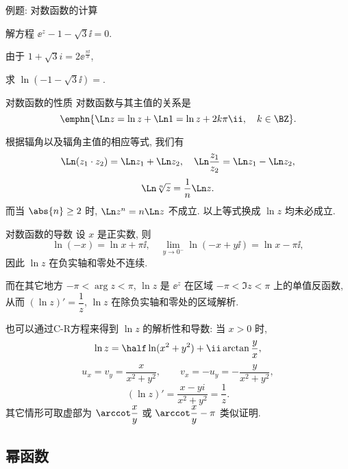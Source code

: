 \begin{frame}{例题: 对数函数的计算}
	\onslide<+->
	\begin{example}
		解方程 $\ee^z-1-\sqrt 3\ii=0$.
	\end{example}

	\onslide<+->
	\begin{solution}
		由于 $1+\sqrt 3 i=2\ee^{\frac{\pi\ii}3}$,
		\bigdel
	\end{solution}

	\onslide<+->
	\begin{exercise}
		求 $\ln(-1-\sqrt3\ii)=$.
	\end{exercise}
\end{frame}


\begin{frame}{对数函数的性质}
	\onslide<+->
	对数函数与其主值的关系是
	\[
		\emphn{\Ln z=\ln z+\Ln 1=\ln z+2k\pi\ii,\quad k\in\BZ}.
	\]

	\onslide<+->
	根据辐角以及辐角主值的相应等式, 我们有
	\[
		\Ln(z_1\cdot z_2)=\Ln z_1+\Ln z_2,\quad
		\Ln\frac{z_1}{z_2}=\Ln z_1-\Ln z_2,
	\]
	\[
		\Ln \sqrt[n]z=\dfrac1n\Ln z.
	\]
	\onslide<+->
	而当 $\abs{n}\ge 2$ 时, \alert{$\Ln z^n=n\Ln z$ 不成立}.
	\onslide<+->
	以上等式换成 $\ln z$ 均未必成立.
\end{frame}


\begin{frame}{对数函数的导数}
\beqskip{1pt}
	\onslide<+->
	设 $x$ 是正实数, 
	\onslide<+->
	则
	\[
		\ln (-x)=\ln x+\pi\ii,\quad
		\lim_{y\to0^-}\ln (-x+y\ii)=\ln x-\pi\ii,
	\]
	\onslide<+->
	因此 $\ln z$ 在负实轴和零处不连续.

	\onslide<+->
	而在其它地方 $-\pi<\arg z<\pi$, $\ln z$ 是 $\ee^z$ 在区域 $-\pi<\Im z<\pi$ 上的单值反函数, 
	\onslide<+->
	从而
	\alert{$(\ln z)'=\dfrac 1z$},
	\alert{$\ln z$ 在除负实轴和零处的区域解析}.

	\onslide<+->
	也可以通过C-R方程来得到 $\ln z$ 的解析性和导数: 当 $x>0$ 时,
	\[
		\ln z=\half \ln(x^2+y^2)+\ii\arctan \frac yx,
	\]
	\onslide<+->
	\[
		u_x=v_y=\frac x{x^2+y^2},\qquad v_x=-u_y=-\frac y{x^2+y^2},
	\]
	\[
		(\ln z)'=\frac{x-yi}{x^2+y^2}=\frac 1z.
	\]
	其它情形可取虚部为 $\arccot\dfrac xy$ 或 $\arccot\dfrac xy-\pi$ 类似证明.
\endgroup
\end{frame}


\subsection{幂函数}

